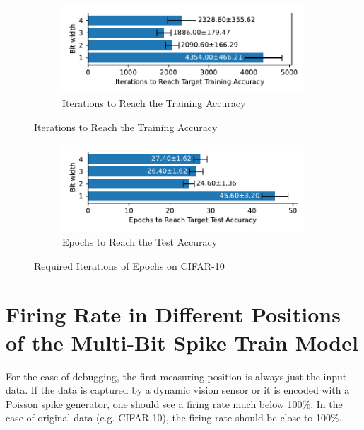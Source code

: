     \label{appendix:iterations_cifar10}
        \begin{figure}[H]
            \centering
            \begin{subfigure}[H]{\textwidth}
                \centering
                \includegraphics[width=\textwidth]{../standard/CIFAR10/plots/cifar10_train_iters_horizontal.pdf}
                \caption{Iterations to Reach the Training Accuracy}
            \end{subfigure}
        \end{figure}
        \begin{figure}[H]
            \centering
            \ContinuedFloat
            \begin{subfigure}[H]{\textwidth}
                \centering
                \includegraphics[width=\textwidth]{../standard/CIFAR10/plots/cifar10_test_iters_horizontal.pdf}
                \caption{Epochs to Reach the Test Accuracy}
            \end{subfigure}
            \caption{Required Iterations of Epochs on CIFAR-10}
        \end{figure}



\chapter{Firing Rate in Different Positions of the Multi-Bit Spike Train Model}
\label{appendix:firerate}

    For the ease of debugging, the first measuring position is always just the input data. If the data is captured by a dynamic vision sensor or it is encoded with a Poisson spike generator, one should see a firing rate much below 100\%. In the case of original data (e.g. CIFAR-10), the firing rate should be close to 100\%. 

